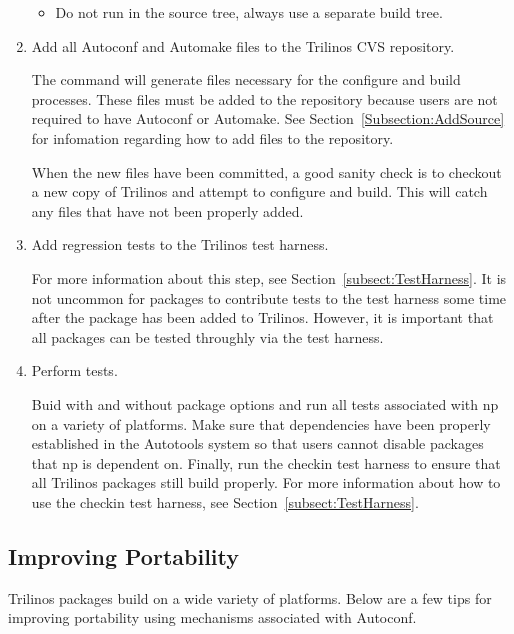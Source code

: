 \documentclass[12pt,strict]{TrilinosDevGuide}
\begin{document}
\begin{enumerate}
\begin{itemize}
\item Do not run  in the source tree, always use a 
separate build tree.

\end{itemize}

\item Add all Autoconf and Automake files to the Trilinos CVS repository.

The  command will generate files necessary for the 
configure and build processes.  These files must be added to the repository 
because users are not required to have Autoconf or Automake.  See 
Section~\ref{Subsection:AddSource} for infomation regarding how to add files 
to the repository.

When the new files have been committed, a good sanity check is to checkout 
a new copy of Trilinos and attempt to configure and build.  This will catch 
any files that have not been properly added.

\item Add regression tests to the Trilinos test harness.

For more information about this step, see Section~\ref{subsect:TestHarness}.
It is not uncommon for packages to contribute tests to the test harness some 
time after the package has been added to Trilinos.  However, it is important 
that all packages can be tested throughly via the test harness.

\item Perform tests.

Buid with and without package options and run all tests associated with np on 
a variety of platforms.  Make sure that dependencies have been properly 
established in the Autotools system so that users cannot disable packages that 
np is dependent on.  Finally, run the checkin test harness to ensure that 
all Trilinos packages still build properly.  For more information about how 
to use the checkin test harness, see Section~\ref{subsect:TestHarness}.

\end{enumerate}

\subsection{Improving Portability}

Trilinos packages build on a wide variety of platforms.  Below are a few tips 
for improving portability using mechanisms associated with Autoconf.
\end{document}
